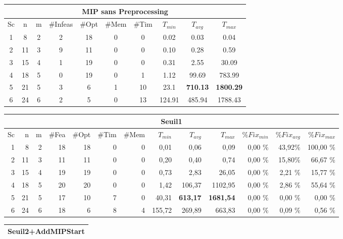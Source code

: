 \documentclass[twoside,fleqn]{EPURapport}
\begin{document}
\begin{table}[h]
    \centering
    \begin{tabular}{|c|c|c|c|c|c|c|c|c|c|} 
    	\hline
    	\multicolumn{10}{|c|}{MIP sans Preprocessing}\\ \hline
Sc &	n	&m & \#Infeas & \#Opt	& \#Mem & \#Tim & $T_{min}$ & $T_{avg}$	& $T_{max}$ \\ \hline
1 &    8    &2 & 2 & 18 & 0 & 0 &  0.02 &  0.03 &  0.04 \\ \hline
2 &    11   &3 & 9 & 11 & 0 & 0 &  0.10 &  0.28 & 0.59  \\ \hline
3 &    15   &4 & 1 & 19 & 0 & 0 &  0.31 &  2.55 &  30.09 \\ \hline
4 &	   18	&5 & 0 & 19 & 0 & 1 &  1.12 &   99.69&  783.99 \\ \hline
5 &	   21	&5 & 3 & 6 & 1 & 10 &  23.1 &  \textbf{710.13} &  \textbf{1800.29} \\ \hline
6 &	   24	&6 & 2 & 5 & 0 & 13 &  124.91 &  485.94 &  1788.43 \\	\hline
    \end{tabular}
\vspace{1em}
    \begin{tabular}{|r|r|r|r|r|r|r|r|r|r|r|r|r|}
    	\hline
    	\multicolumn{13}{|c|}{Seuil1}\\ \hline
Sc &	n	&m	&\#Fea	&\#Opt	&\#Tim &\#Mem	&$T_{min}$ & $T_{avg}$	& $T_{max}$ & $\%Fix_{min}$ & $\%Fix_{avg}$	& $\%Fix_{max}$ \\ \hline
1&  	8	& 2	& 18	& 18	& 0	& 0	 & 0,01	    	&0,06	&0,09		&0,00	\%&43,92\%&	100,00 \%    \\ \hline
2& 	    11	& 3	& 11	& 11	& 0	& 0	 & 0,20	    	&0,40	&0,74		&0,00	\%&15,80\%&	66,67  \%     \\ \hline
3&  	15	& 4	& 19	& 19	& 0	& 0	 & 0,73	        &2,83	&26,05	&0,00	\%&2,21	\%&15,77   \%  \\ \hline
4&		18	&5	&	20	&	20	&0	&	0&		1,42	&106,37	&1102,95&0,00	\%&2,86	\%&55,64   \%    \\ \hline
5&		21	&5	&	17	&	10	&7	&	0&		40,31	&\textbf{613,17}	&\textbf{1681,54}	&0,00	\%&0,00	\%&0,00    \%     \\ \hline
6&		24	&6	&	18	&	6	&8	&	4&		155,72	&269,89	&663,83	&0,00	\%&0,09	\%&0,56    \%  \\ \hline
    \end{tabular} 
\vspace{1em}
    \begin{tabular}{|r|r|r|r|r|r|r|r|r|r|r|r|r|}
    	\hline
    	\multicolumn{13}{|c|}{Seuil2+AddMIPStart}\\ \hline

\end{tabular}
\end{table}
\end{document}
